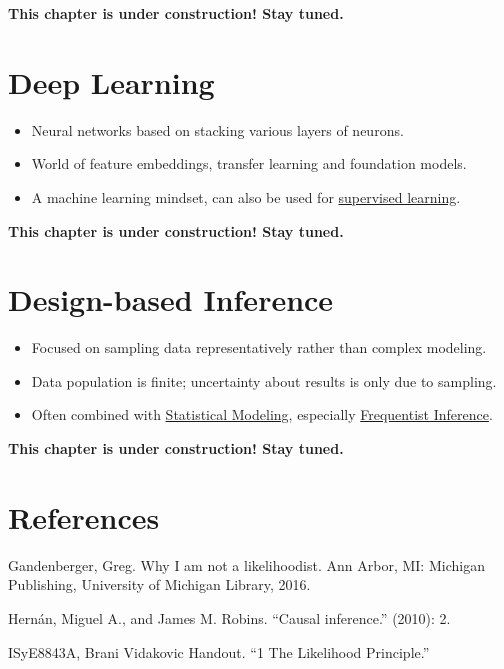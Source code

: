\documentclass[
  10pt,
]{scrbook}
\providecommand{\tightlist}{%
  \setlength{\itemsep}{0pt}\setlength{\parskip}{0pt}}
\begin{document}
\textbf{This chapter is under construction! Stay tuned.}

\hypertarget{deep-learning}{%
\chapter{Deep Learning}\label{deep-learning}}

\begin{itemize}
\tightlist
\item
  Neural networks based on stacking various layers of neurons.
\item
  World of feature embeddings, transfer learning and foundation models.
\item
  A machine learning mindset, can also be used for \protect\hyperlink{supervised-ml}{supervised learning}.
\end{itemize}

\textbf{This chapter is under construction! Stay tuned.}

\hypertarget{design-based-inference}{%
\chapter{Design-based Inference}\label{design-based-inference}}

\begin{itemize}
\tightlist
\item
  Focused on sampling data representatively rather than complex modeling.
\item
  Data population is finite; uncertainty about results is only due to sampling.
\item
  Often combined with \protect\hyperlink{statistical-modeling}{Statistical Modeling}, especially \protect\hyperlink{frequentist-inference}{Frequentist Inference}.
\end{itemize}

\textbf{This chapter is under construction! Stay tuned.}

\hypertarget{references}{%
\chapter*{References}\label{references}}


Gandenberger, Greg. Why I am not a likelihoodist. Ann Arbor, MI: Michigan Publishing, University of Michigan Library, 2016.

Hernán, Miguel A., and James M. Robins. ``Causal inference.'' (2010): 2.

ISyE8843A, Brani Vidakovic Handout. ``1 The Likelihood Principle.''
\end{document}
